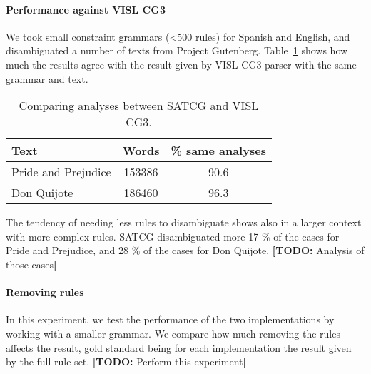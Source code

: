 \documentclass[11pt]{article}
\newcommand{\todo}[1]{{\color{cyan}\textbf{[TODO: }#1\textbf{]}}}
\begin{document}
\paragraph{Performance against VISL CG3}
We took small constraint grammars (\textless{}500 rules) for Spanish and English, and disambiguated a number of texts from Project Gutenberg. Table~\ref{table:results} shows how much the results agree with the result given by VISL CG3 parser with the same grammar and text.

\begin{table}
  \centering
  \begin{tabular}{|l|c|c|}
     \hline
    \textbf{Text} & \textbf{Words} & \textbf{\% same analyses} \\
    \hline
	Pride and Prejudice & 153386 & 90.6 \\  
    \hline
       Don Quijote & 186460 & 96.3  \\ 
     \hline
  \end{tabular}
  \caption{Comparing analyses between SATCG and VISL CG3.}
  \label{table:results}
\end{table}

The tendency of needing less rules to disambiguate shows also in a larger context with more complex rules. 
SATCG disambiguated more 17 \% of the cases for Pride and Prejudice, and 28 \% of the cases for Don Quijote. \todo{Analysis of those cases}

\paragraph{Removing rules}

In this experiment, we test the performance of the two implementations by working with a smaller grammar. We compare how much removing the rules affects the result, gold standard being for each implementation the result given by the full rule set.
\todo{Perform this experiment}





\end{document}
